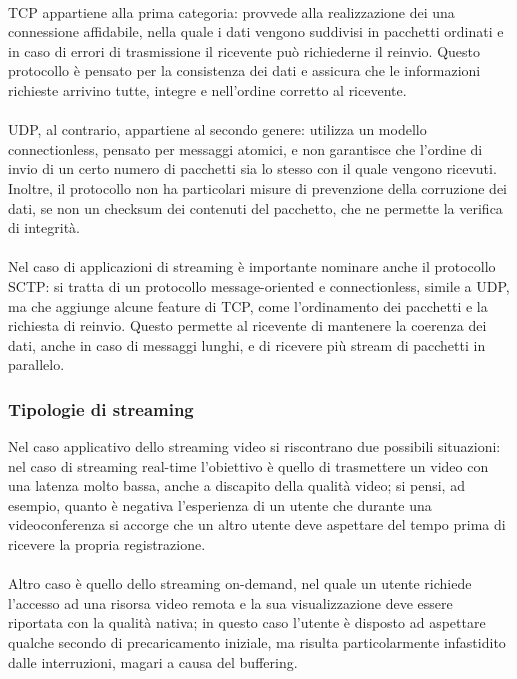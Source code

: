 			\paragraph*{} \gls{TCP} appartiene alla prima categoria: provvede alla realizzazione dei una connessione affidabile, nella quale i dati vengono suddivisi in pacchetti ordinati e in caso di errori di trasmissione il ricevente può richiederne il reinvio. Questo protocollo è pensato per la consistenza dei dati e assicura che le informazioni richieste arrivino tutte, integre e nell'ordine corretto al ricevente.
			\paragraph*{}
			\gls{UDP}, al contrario, appartiene al secondo genere: utilizza un modello connectionless, pensato per messaggi atomici, e non garantisce che l'ordine di invio di un certo numero di pacchetti sia lo stesso con il quale vengono ricevuti. Inoltre, il protocollo non ha particolari misure di prevenzione della corruzione dei dati, se non un checksum dei contenuti del pacchetto, che ne permette la verifica di integrità.
			\paragraph*{}
			Nel caso di applicazioni di streaming è importante nominare anche il protocollo \gls{SCTP}: si tratta di un protocollo message-oriented e connectionless, simile a \gls{UDP}, ma che aggiunge alcune feature di \gls{TCP}, come l'ordinamento dei pacchetti e la richiesta di reinvio. Questo permette al ricevente di mantenere la coerenza dei dati, anche in caso di messaggi lunghi, e di ricevere più stream di pacchetti in parallelo.

		\subsubsection{Tipologie di streaming}
			Nel caso applicativo dello streaming video si riscontrano due possibili situazioni:
			nel caso di streaming real-time l'obiettivo è quello di trasmettere un video con una latenza molto bassa, anche a discapito della qualità video; si pensi, ad esempio, quanto è negativa l'esperienza di un utente che durante una videoconferenza si accorge che un altro utente deve aspettare del tempo prima di ricevere la propria registrazione.
			\paragraph*{}
			Altro caso è quello dello streaming on-demand, nel quale un utente richiede l'accesso ad una risorsa video remota e la sua visualizzazione deve essere riportata con la qualità nativa; in questo caso l'utente è disposto ad aspettare qualche secondo di precaricamento iniziale, ma risulta particolarmente infastidito dalle interruzioni, magari a causa del buffering.
